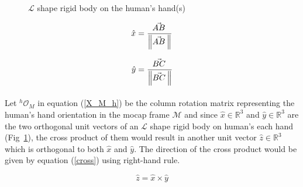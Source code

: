 \documentclass[a4paper, 12pt, oneside]{Thesis}  %
\begin{document}
\begin{figure}[ht]
	\caption{$\mathcal{L}$ shape rigid body on the human's hand(s)}
	\label{fig:lshapes}
\end{figure}

\begin{equation*}
\hat{x} = \frac{\vec{AB}^{\,}}{\norm{\vec{AB}^{\,}}}
\end{equation*}

\begin{equation*}
\hat{y} = \frac{\vec{BC}^{\,}}{\norm{\vec{BC}^{\,}}}
\end{equation*}

\paragraph*{}
Let ${}^{h}\mathcal{O}_{M}$ in equation (\ref{X_M_h}) be the column rotation matrix representing the human's hand orientation in the mocap frame $\mathcal{M}$ and since $\hat{x} \in \mathbb{R}^{3}$ and $\hat{y} \in \mathbb{R}^{3}$ are the two orthogonal unit vectors of an $\mathcal{L}$ shape rigid body on human's each hand (Fig~\ref{fig:lshapes}), the cross product of them would result in another unit vector $\hat{z} \in \mathbb{R}^{3}$ which is orthogonal to both $\hat{x}$ and $\hat{y}$. The direction of the cross product would be given by equation (\ref{cross}) using right-hand rule.


\begin{equation}\label{cross}
\hat{z} = \hat{x} \times \hat{y}
\end{equation}
\end{document}
